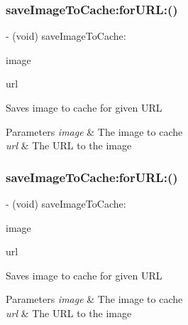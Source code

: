 \subsubsection{\texorpdfstring{save\+Image\+To\+Cache\+:for\+U\+R\+L\+:()}{saveImageToCache:forURL:()}\hspace{0.1cm}{\footnotesize\ttfamily [1/3]}}
{\footnotesize\ttfamily -\/ (void) save\+Image\+To\+Cache\+: \begin{DoxyParamCaption}\item[{(U\+I\+Image $\ast$)}]{image }\item[{forURL:(N\+S\+U\+RL $\ast$)}]{url }\end{DoxyParamCaption}}

Saves image to cache for given U\+RL


\begin{DoxyParams}{Parameters}
{\em image} & The image to cache \\
\hline
{\em url} & The U\+RL to the image \\
\hline
\end{DoxyParams}
\mbox{\label{interface_s_d_web_image_manager_acd286f805e3334824648122fd213937e}} 
\subsubsection{\texorpdfstring{save\+Image\+To\+Cache\+:for\+U\+R\+L\+:()}{saveImageToCache:forURL:()}\hspace{0.1cm}{\footnotesize\ttfamily [2/3]}}
{\footnotesize\ttfamily -\/ (void) save\+Image\+To\+Cache\+: \begin{DoxyParamCaption}\item[{(U\+I\+Image $\ast$)}]{image }\item[{forURL:(N\+S\+U\+RL $\ast$)}]{url }\end{DoxyParamCaption}}

Saves image to cache for given U\+RL


\begin{DoxyParams}{Parameters}
{\em image} & The image to cache \\
\hline
{\em url} & The U\+RL to the image \\
\hline
\end{DoxyParams}
\mbox{\label{interface_s_d_web_image_manager_acd286f805e3334824648122fd213937e}} 
